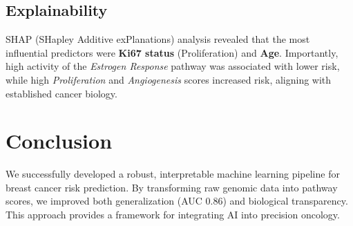 \documentclass{article}
\begin{document}
\subsection{Explainability}
SHAP (SHapley Additive exPlanations) analysis revealed that the most influential predictors were \textbf{Ki67 status} (Proliferation) and \textbf{Age}. Importantly, high activity of the \textit{Estrogen Response} pathway was associated with lower risk, while high \textit{Proliferation} and \textit{Angiogenesis} scores increased risk, aligning with established cancer biology.

\section{Conclusion}
We successfully developed a robust, interpretable machine learning pipeline for breast cancer risk prediction. By transforming raw genomic data into pathway scores, we improved both generalization (AUC 0.86) and biological transparency. This approach provides a framework for integrating AI into precision oncology.
\end{document}
